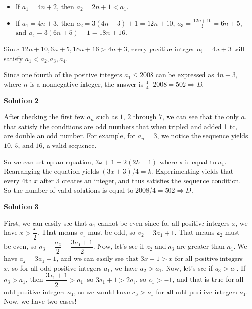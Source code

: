 \begin{enumerate}
            \begin{itemize}
        \item If $a_1=4n+2$, then $a_2=2n+1<a_1$.
            \end{itemize}
            
            \begin{itemize}
        \item If $a_1=4n+3$, then $a_2=3(4n+3)+1=12n+10$, $a_3=\frac{12n+10}{2}=6n+5$, and $a_4=3(6n+5)+1=18n+16$.
            \end{itemize}
            Since $12n+10, 6n+5, 18n+16 > 4n+3$, every positive integer $a_1=4n+3$ will satisfy $a_1<a_2,a_3,a_4$. 

 Since one fourth of the positive integers $a_1 \le 2008$ can be expressed as $4n+3$, where $n$ is a nonnegative integer, the answer is $\frac{1}{4}\cdot 2008 = 502 \Rightarrow D$.

 



\textbf{Solution 2}

After checking the first few $a_n$ such as $1$, $2$ through $7$, we can see that the only $a_1$ that satisfy the conditions are odd numbers that when tripled and added 1 to, are double an odd number. For example, for $a_n=3$, we notice the sequence yields $10$, $5$, and $16$, a valid sequence.

 So we can set up an equation, $3x + 1 = 2(2k - 1)$ where x is equal to $a_1$. Rearranging the equation yields $(3x + 3)/4 = k$. Experimenting yields that every 4th $x$ after 3 creates an integer, and thus satisfies the sequence condition. So the number of valid solutions is equal to $2008/4 = 502 \Rightarrow D$.

 



\textbf{Solution 3}

First, we can easily see that $a_1$ cannot be even since for all positive integers $x$, we have $x>\dfrac{x}2$. That means $a_1$ must be odd, so $a_2=3a_1+1$. That means $a_2$ must be even, so $a_3=\dfrac{a_2}2=\dfrac{3a_1+1}2$. Now, let's see if $a_2$ and $a_3$ are greater than $a_1$. We have $a_2=3a_1+1$, and we can easily see that $3x+1>x$ for all positive integers $x$, so for all odd positive integers $a_1$, we have $a_2>a_1$. Now, let's see if $a_3>a_1$. If $a_3>a_1$, then $\dfrac{3a_1+1}2>a_1$, so $3a_1+1>2a_1$, so $a_1>-1$, and that is true for all odd positive integers $a_1$, so we would have $a_3>a_1$ for all odd positive integers $a_1$. Now, we have two cases!


\end{enumerate}

